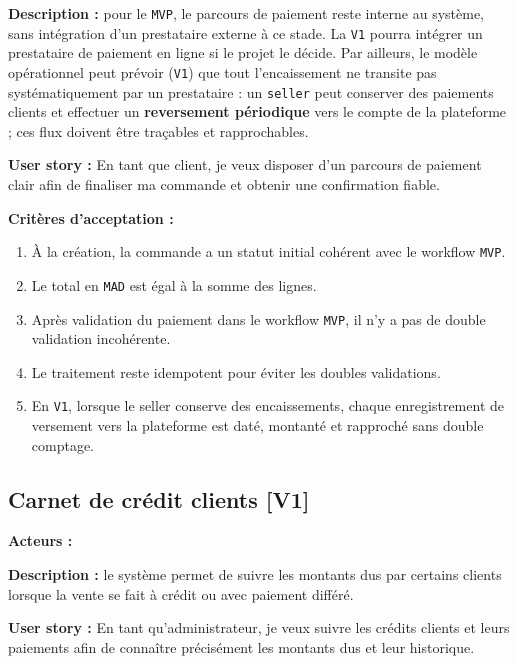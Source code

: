 \documentclass[11pt,a4paper]{scrreprt}
\newcommand{\code}[1]{\texttt{#1}}
\newcommand{\phase}[1]{\textbf{\textcolor{SplinAmber}{#1}}}
\newcommand{\actorbadge}[1]{\highlight{\code{#1}}}
\begin{document}
\textbf{Description :} pour le \code{MVP}, le parcours de paiement reste interne au système, sans intégration d'un prestataire externe à ce stade. La \code{V1} pourra intégrer un prestataire de paiement en ligne si le projet le décide. Par ailleurs, le modèle opérationnel peut prévoir (\code{V1}) que tout l'encaissement ne transite pas systématiquement par un prestataire : un \code{seller} peut conserver des paiements clients et effectuer un \textbf{reversement périodique} vers le compte de la plateforme ; ces flux doivent être traçables et rapprochables.

\textbf{User story :} En tant que client, je veux disposer d'un parcours de paiement clair afin de finaliser ma commande et obtenir une confirmation fiable.

\textbf{Critères d'acceptation :}
\begin{enumerate}
  \item À la création, la commande a un statut initial cohérent avec le workflow \code{MVP}.
  \item Le total en \code{MAD} est égal à la somme des lignes.
  \item Après validation du paiement dans le workflow \code{MVP}, il n'y a pas de double validation incohérente.
  \item Le traitement reste idempotent pour éviter les doubles validations.
  \item En \code{V1}, lorsque le seller conserve des encaissements, chaque enregistrement de versement vers la plateforme est daté, montanté et rapproché sans double comptage.
\end{enumerate}

\subsection{Carnet de crédit clients \phase{[V1]}}
\textbf{Acteurs :} \actorbadge{ADMIN} \actorbadge{CUSTOMER}

\textbf{Description :} le système permet de suivre les montants dus par certains clients lorsque la vente se fait à crédit ou avec paiement différé.

\textbf{User story :} En tant qu'administrateur, je veux suivre les crédits clients et leurs paiements afin de connaître précisément les montants dus et leur historique.
\end{document}
